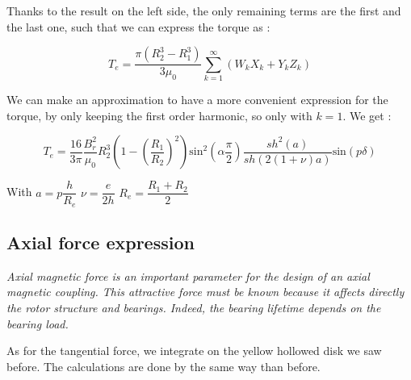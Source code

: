 Thanks to the result on the left side, the only remaining terms are the first and the last one, such that we can express the torque as : 

\begin{equation*}
    T_e =  \dfrac{\pi(R_2^3-R_1^3)}{3\mu_0} \sum_{k=1}^{\infty}(W_kX_k+Y_kZ_k)
\end{equation*}

We can make an approximation to have a more convenient expression for the torque, by only keeping the first order harmonic, so only with $k=1$. We get : 

\begin{equation*}
    T_e = \dfrac{16}{3\pi}\dfrac{B^2_r}{\mu_0}R_2^3\left(1-\left(\dfrac{R_1}{R_2}\right)^2\right) \text{sin}^2\left(\alpha\dfrac{\pi}{2}\right)\dfrac{sh^2(a)}{sh(2(1+\nu)a)} \text{sin}(p\delta)
\end{equation*}

\vspace{1cm}

With  \hfill $a = p\dfrac{h}{R_e}$ \hfill $\nu = \dfrac{e}{2h}$ \hfill  $R_e = \dfrac{R_1+R_2}{2}$

\subsection*{Axial force expression}
\textit{Axial magnetic force is an important parameter for the design
of an axial magnetic coupling. This attractive force must
be known because it affects directly the rotor structure and bearings.
Indeed, the bearing lifetime depends on the bearing load.} \par
As for the tangential force, we integrate on the yellow hollowed disk we saw before. The calculations are done by the same way than before.

